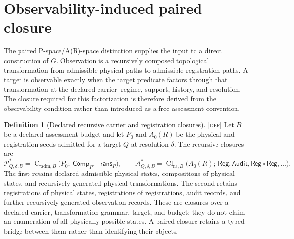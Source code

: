 \documentclass[11pt]{article}
\newcommand{\Reg}{\ensuremath{\mathsf{Reg}}}
\newcommand{\Audit}{\ensuremath{\mathsf{Audit}}}
\newcommand{\Defn}{\textsc{[def]}}
\theoremstyle{definition}
\newtheorem{sdefinition}{Definition}
\begin{document}
\section{Observability-induced paired closure}
\label{supp:observability-induced-closure}

The paired P-space/A(R)-space distinction supplies the input to a direct
construction of $G$. Observation is a recursively composed topological
transformation from admissible physical paths to admissible registration paths. A
target is observable exactly when the target predicate factors through that
transformation at the declared carrier, regime, support, history, and resolution.
The closure required for this factorization is therefore derived from the
observability condition rather than introduced as a free assessment convention.

\begin{sdefinition}[Declared recursive carrier and registration closures]
\label{def:declared-recursive-closures}
\Defn{} Let $B$ be a declared assessment budget and let $P_0$ and $A_0(R)$ be the
physical and registration seeds admitted for a target $Q$ at resolution $\delta$.
The recursive closures are
\begin{equation}
\mathcal P^{\ast}_{Q,\delta,B}=
\operatorname{Cl}_{\mathrm{adm},B}
\bigl(P_0;\ \mathsf{Comp}_{P},\mathsf{Trans}_{P}\bigr),
\qquad
\mathcal A^{\ast}_{Q,\delta,B}=
\operatorname{Cl}_{\mathrm{ne},B}
\bigl(A_0(R);\ \Reg,\Audit,\Reg\!\circ\!\Reg,\ldots\bigr).
\label{eq:declared-recursive-closures}
\end{equation}
The first retains declared admissible physical states, compositions of physical
states, and recursively generated physical transformations. The second retains
registrations of physical states, registrations of registrations, audit records,
and further recursively generated observation records. These are closures over a
declared carrier, transformation grammar, target, and budget; they do not claim an
enumeration of all physically possible states. A paired closure retains a typed
bridge between them rather than identifying their objects.
\end{sdefinition}
\end{document}
